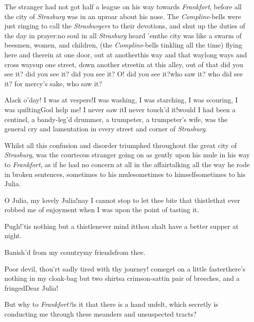 \documentclass{article}
\begin{document}
The stranger had not got half a league on his way towards
\textit{Frankfort}, before all the city of \textit{Strasburg} was in an
uproar about his nose. The \textit{Compline}-bells were just ringing
to call the \textit{Strasburgers} to their devotions, and shut up the
duties of the day in prayer:\tsk no soul in all \textit{Strasburg}
heard ’em\tsk the city was like a swarm of
bees\tsh men, women, and children, (the
\textit{Compline}-bells tinkling all the time) flying here
and there\tsk in at one door, out at another\tsk this way
and that way\tsk long ways and cross ways\tsk up one street,
down another street\tsk in at this alley, out of that\tsh
did you see it? did you see it? did you see it? O! did you
see it?\tsh who saw it? who did see it? for mercy’s sake,
who saw it?

Alack o’day! I was at vespers!\tsk I was washing, I was
starching, I was
scouring, I was quilting\tsk God help me!  I never saw
it\tsk I never touch’d it!\tsh would I had been a centinel,
a bandy-leg’d drummer, a trumpeter, a trumpe\-ter’s wife, was
the general cry and la\-men\-t\-ation in every street and corner
of\break
\textit{Strasburg}.

Whilst all this confusion and disorder triumphed throughout the
great city of \textit{Strasburg}, was the courteous stranger going on
as gently upon his mule in his way to \textit{Frankfort}, as if he
had no concern at all in the affair\tsh talking all the
way he rode in broken sentences, sometimes to his
mule\tsk sometimes to himself\tsh sometimes to his Julia.

O Julia, my lovely Julia!\tsk nay I cannot stop to let thee
bite that thistle\tsk that ever 
 robbed me of enjoyment when I was upon the point
of tasting it.\tsk

\tsk Pugh!\tsk ’tis nothing but a thistle\tsk never mind
it\tsk thou shalt have a better supper at night.\tsk

\tsh Banish’d from my country\tsk my friends\tsk from thee.\tsk

Poor devil, thou’rt sadly tired with thy journey!\tsk
come\tsk get on a little faster\tsk there’s nothing in my
cloak-bag but two shirts\tsk a crimson-sattin pair of
breeches, and a fringed\tsk Dear Julia!

\tsh But why to \textit{Frankfort?}\tsk is it that there is
a hand unfelt, which secretly is conducting me through these
meanders and unsuspected tracts?\tsk{}
\end{document}
